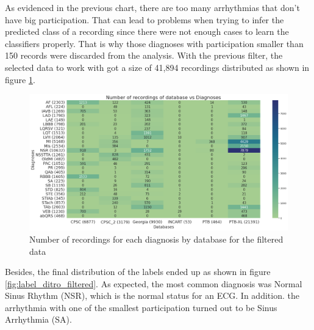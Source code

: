 As evidenced in the previous chart, there are too many arrhythmias that don't have big participation. That can lead to problems when trying to infer the predicted class of a recording since there were not enough cases to learn the classifiers properly. That is why those diagnoses with participation smaller than 150 records were discarded from the analysis. With the previous filter, the selected data to work with got a size of 41,894 recordings distributed as shown in figure \ref{fig:diagnose_count_by_db_filtered}.

\begin{figure}[H]
\centering
\includegraphics[scale=0.32]{img/diagnose_count_by_db_filtered.png}
\caption{Number of recordings for each diagnosis by database for the filtered data}
\label{fig:diagnose_count_by_db_filtered}
\end{figure}

Besides, the final distribution of the labels ended up as shown in figure \ref{fig:label_ditro_filtered}. As expected, the most common diagnosis was Normal Sinus Rhythm (NSR), which is the normal status for an ECG. In addition. the arrhythmia with one of the smallest participation turned out to be Sinus Arrhythmia (SA).

